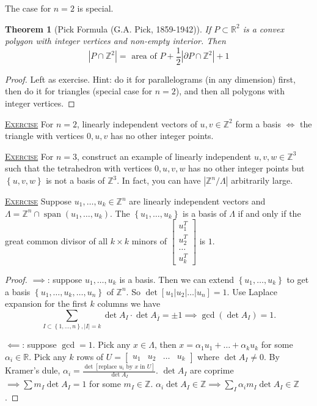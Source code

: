 \documentclass{report}
\newcommand{\R}{\mathbb{R}}
\newcommand{\Z}{\mathbb{Z}}
\newcommand{\set}[1]{\left\{ #1 \right\}}
\newcommand{\fancyem}[1]{\underline{\textsc{#1}}}
\newtheorem{theorem}{Theorem}[section]
\theoremstyle{definition}
\theoremstyle{remark}
\numberwithin{equation}{section}
\begin{document}
The case for $n = 2$ is special. 
\begin{theorem}[Pick Formula (G.A. Pick, 1859-1942)]
    If $P \subset \R^2$ is a convex polygon with integer vertices and non-empty interior. Then \[
    |P \cap \Z^2| = \text{ area of } P + \frac{1}{2}|\partial P \cap \Z^2| + 1
    \]
\end{theorem}
\begin{proof}
    Left as exercise. Hint: do it for parallelograms (in any dimension) first, then do it for triangles (special case for $n = 2$), and then all polygons with integer vertices.
\end{proof}

\fancyem{Exercise} For $n = 2$, linearly independent vectors of $u, v \in \Z^2$ form a basis $\iff$ the triangle with vertices $0, u, v$ has no other integer points.

\fancyem{Exercise} For $n = 3$, construct an example of linearly independent $u, v, w \in \Z^3$ such that the tetrahedron  with vertices $0, u, v, w$ has no other integer points but $\set{u, v, w}$ is not a basis of $\Z^3$. In fact, you can have $|\Z^n/\Lambda|$ arbitrarily large.

\fancyem{Exercise} Suppose $u_1, \ldots, u_k \in \Z^n$ are linearly independent vectors and $\Lambda = \Z^n \cap \operatorname{span}(u_1, \ldots, u_k)$. The $\set{u_1, \ldots, u_k}$ is a basis of $\Lambda$ if and only if the great common divisor of all $k \times k$ minors of $\begin{bmatrix}
    u_1^T \\
    u_2^T \\
    \ldots \\
    u_k^T
\end{bmatrix}$ is $1$.
\begin{proof}
    $\implies$: suppose $u_1, \ldots, u_k$ is a basis. Then we can extend $\set{u_1, \ldots, u_k}$ to get a basis $\set{u_1, \ldots, u_k, \ldots, u_n}$ of $\Z^n$. So $\det[u_1|u_2|\ldots|u_n] = 1$. Use Laplace expansion for the first $k$ columns we have \[
        \sum_{I \subset \set{1, \ldots, n}, |I| = k} \det A_I \cdot \det A_{\overline{I}} = \pm 1 \implies \gcd (\det A_I) = 1.
    \]

    $\impliedby$: suppose $\gcd = 1$. Pick any $x \in \Lambda$, then $x = \alpha_1u_1+\ldots+\alpha_ku_k$ for some $\alpha_i \in \R$. Pick any $k$ rows of $U = \left[
        \begin{array}{c|c|c|c}
        u_1 & u_2 & \ldots & u_k
    \end{array}\right]$ where $\det A_I \neq 0$. By Kramer's dule, $\alpha_i = \frac{\det [\text{replace $u_i$ by $x$ in $U$}]}{\det A_I}$. $\det A_I$ are coprime $\implies \sum m_I \det A_I = 1$ for some $m_I \in \Z$. $\alpha_i\det A_I \in \Z \implies  \sum_{I} \alpha_i m_I \det A_I \in \Z$.
\end{proof}
\end{document}
